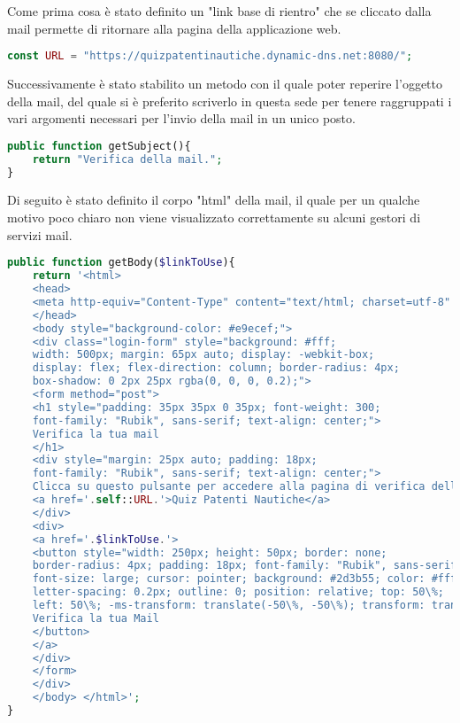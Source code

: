 Come prima cosa è stato definito un "link base di rientro" che se cliccato dalla mail permette di ritornare alla pagina della applicazione web.\\

 \begin{lstlisting}[language=php]
	const URL = "https://quizpatentinautiche.dynamic-dns.net:8080/";
 \end{lstlisting}
 
  Successivamente è stato stabilito un metodo con il quale poter reperire l'oggetto della mail, del quale si è preferito scriverlo in questa sede per tenere raggruppati i vari argomenti necessari per l'invio della mail in un unico posto.\\
 
\begin{lstlisting}[language=php]
public function getSubject(){
	return "Verifica della mail.";
}
\end{lstlisting}

Di seguito è stato definito il corpo "html" della mail, il quale per un qualche motivo poco chiaro non viene visualizzato correttamente su alcuni gestori di servizi mail. \\

\begin{lstlisting}[language=php]
public function getBody($linkToUse){
	return '<html>
	<head>
	<meta http-equiv="Content-Type" content="text/html; charset=utf-8" />
	</head>
	<body style="background-color: #e9ecef;">
	<div class="login-form" style="background: #fff;
	width: 500px; margin: 65px auto; display: -webkit-box;
	display: flex; flex-direction: column; border-radius: 4px;
	box-shadow: 0 2px 25px rgba(0, 0, 0, 0.2);">
	<form method="post">
	<h1 style="padding: 35px 35px 0 35px; font-weight: 300;
	font-family: "Rubik", sans-serif; text-align: center;">
	Verifica la tua mail
	</h1>
	<div style="margin: 25px auto; padding: 18px;
	font-family: "Rubik", sans-serif; text-align: center;">
	Clicca su questo pulsante per accedere alla pagina di verifica della mail inserita su:
	<a href='.self::URL.'>Quiz Patenti Nautiche</a>
	</div>
	<div>
	<a href='.$linkToUse.'>
	<button style="width: 250px; height: 50px; border: none;
	border-radius: 4px; padding: 18px; font-family: "Rubik", sans-serif;
	font-size: large; cursor: pointer; background: #2d3b55; color: #fff;
	letter-spacing: 0.2px; outline: 0; position: relative; top: 50\%;
	left: 50\%; -ms-transform: translate(-50\%, -50\%); transform: translate(-50\%, -50\%);">
	Verifica la tua Mail
	</button>
	</a>
	</div>
	</form>
	</div>
	</body>	</html>';
}
 \end{lstlisting}
 

